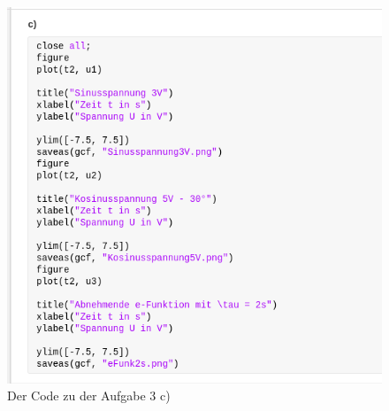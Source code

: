 \documentclass{article}
\begin{document}
\begin{figure}[!h]
  \centering
  \includegraphics[width=.55\textwidth]{../assets/images/ET2P6/aufgaben3c.png}
  \caption{Der Code zu der Aufgabe 3 c)}
  \label{fig:auf3c}
\end{figure}
\end{document}
